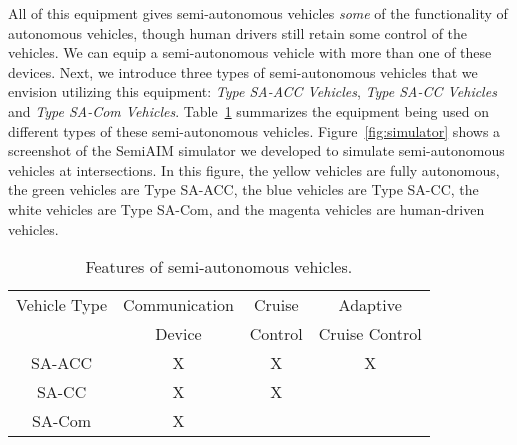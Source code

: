 All of this equipment gives semi-autonomous vehicles \emph{some} of
the functionality of autonomous vehicles, though human drivers still
retain some control of the vehicles.  We can equip a semi-autonomous
vehicle with more than one of these devices.  Next, we introduce three
types of semi-autonomous vehicles that we envision utilizing this
equipment: \textit{Type SA-ACC Vehicles}, \textit{Type SA-CC Vehicles}
and \textit{Type SA-Com Vehicles}.  Table~\ref{table:type} summarizes
the equipment being used on different types of these semi-autonomous
vehicles.  Figure~\ref{fig:simulator} shows a screenshot of the
SemiAIM simulator we developed to simulate semi-autonomous vehicles at
intersections. In this figure, the yellow vehicles are fully
autonomous, the green vehicles are Type SA-ACC, the blue vehicles are
Type SA-CC, the white vehicles are Type SA-Com, and the magenta
vehicles are human-driven vehicles.



\begin{table}
\centering
\caption{Features of semi-autonomous vehicles.}
\label{table:type}
\small
\vspace{-.1in}
\begin{tabular}{|c|c|c|c|}
  \hline
  Vehicle Type & Communication & Cruise & Adaptive \\
               & Device & Control & Cruise Control \\
  \hline
  SA-ACC & X & X & X  \\
  SA-CC & X & X &  \\
  SA-Com & X & &  \\
  \hline
\end{tabular}
\vspace{-.3in}
\end{table}

